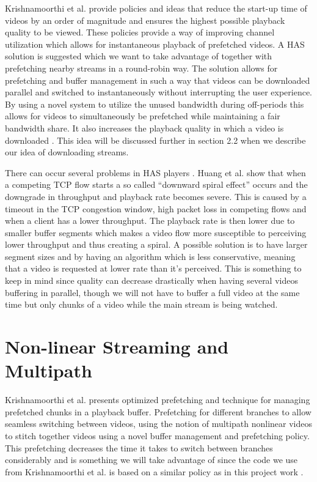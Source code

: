 Krishnamoorthi et al. \cite{bandawarePrefetch} provide policies and ideas that reduce the start-up time of videos by an order of magnitude and ensures the highest possible playback quality to be viewed. These policies provide a way of improving channel utilization which allows for instantaneous playback of prefetched videos. A HAS solution is suggested which we want to take advantage of together with prefetching nearby streams in a round-robin way. The solution allows for prefetching and buffer management in such a way that videos can be downloaded parallel and switched to instantaneously without interrupting the user experience. By using a novel system to utilize the unused bandwidth during off-periods this allows for videos to simultaneously be prefetched while maintaining a fair bandwidth share. It also increases the playback quality in which a video is downloaded \cite{bandawarePrefetch}. This idea will be discussed further in section 2.2 when we describe our idea of downloading streams.

There can occur several problems in HAS players \cite{qualbranch}. Huang et al. \cite{streamrate} show that when a competing TCP flow starts a so called “downward spiral effect” occurs and the downgrade in throughput and playback rate becomes severe. This is caused by a timeout in the TCP congestion window, high packet loss in competing flows and when a client has a lower throughput. The playback rate is then lower due to smaller buffer segments which makes a video flow more susceptible to perceiving lower throughput and thus creating a spiral. A possible solution is to have larger segment sizes and by having an algorithm which is less conservative, meaning that a video is requested at lower rate than it's perceived. This is something to keep in mind since quality can decrease drastically when having several videos buffering in parallel, though we will not have to buffer a full video at the same time but only chunks of a video while the main stream is being watched.

\section{Non-linear Streaming and Multipath}
\label{sec:nonlinear}

Krishnamoorthi et al. \cite{hasmultipath} presents optimized prefetching and technique for managing prefetched chunks in a playback buffer. Prefetching for different branches to allow seamless switching between videos, using the notion of multipath nonlinear videos to stitch together videos using a novel buffer management and prefetching policy. This prefetching decreases the time it takes to switch between branches considerably and is something we will take advantage of since the code we use from Krishnamoorthi et al.\cite{qualbranch} is based on a similar policy as in this project work \cite{hasmultipath}. 

